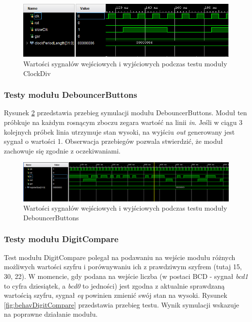 \documentclass[12pt] {article}
\begin{document}
\begin{figure}[H]
\centering
\includegraphics[width=\textwidth]{res/behav_sims/ClkDiv_behavSim_1.png}
\caption{Wartości sygnałów wejściowych i wyjściowych podczas testu moduły ClockDiv}
\label{fig:behavClockDiv}
\end{figure}


\subsubsection{Testy modułu DebouncerButtons}
Rysunek \ref{fig:behavDebounderButtons} przedstawia przebieg symulacji modułu DebouncerButtons. Moduł ten próbkuje na każdym rosnącym zboczu zegara wartość na linii \textit{in}. Jeśli w ciągu 3 kolejnych próbek linia utrzymuje stan wysoki, na wyjściu \textit{out} generowany jest sygnał o wartości 1. Obserwacja przebiegów pozwala stwierdzić, że moduł zachowuje się zgodnie z oczekiwaniami.

\begin{figure}[H]
\centering
\includegraphics[width=\textwidth]{res/behav_sims/DebouncerButtons_behavSim_1.png}
\caption{Wartości sygnałów wejściowych i wyjściowych podczas testu moduły DebouncerButtons}
\label{fig:behavDebounderButtons}
\end{figure}




\subsubsection{Testy modułu DigitCompare}
Test modułu DigitCompare polegał na podawaniu na wejście modułu różnych możliwych wartości szyfru i porównywaniu ich z prawdziwym szyfrem (tutaj 15, 30, 22). W momencie, gdy podana na wejście liczba (w postaci BCD - sygnał \textit{bcd1} to cyfra dziesiątek, a \textit{bcd0} to jedności) jest zgodna z aktualnie sprawdzaną wartością szyfru, sygnał \textit{eq} powinien zmienić swój stan na wysoki. Rysunek \ref{fig:behavDigitCompare} przedstawia przebieg testu. Wynik symulacji wskazuje na poprawne działanie modułu.
\end{document}
